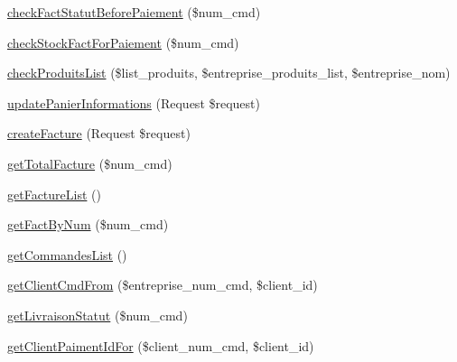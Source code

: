\begin{DoxyCompactItemize}
\item 
\mbox{\hyperlink{class_app_1_1_http_1_1_controllers_1_1_facture_controller_a31a98707fdd24667fdc5f63de65a1b97}{check\+Fact\+Statut\+Before\+Paiement}} (\$num\+\_\+cmd)
\item 
\mbox{\hyperlink{class_app_1_1_http_1_1_controllers_1_1_facture_controller_a9afa0af460ccb1466d9425829c71dd89}{check\+Stock\+Fact\+For\+Paiement}} (\$num\+\_\+cmd)
\item 
\mbox{\hyperlink{class_app_1_1_http_1_1_controllers_1_1_facture_controller_a41644d2baad1924ca3d3ed4b8304b62d}{check\+Produits\+List}} (\$list\+\_\+produits, \$entreprise\+\_\+produits\+\_\+list, \$entreprise\+\_\+nom)
\item 
\mbox{\hyperlink{class_app_1_1_http_1_1_controllers_1_1_facture_controller_ac10d400a1f19f170843319227315573b}{update\+Panier\+Informations}} (Request \$request)
\item 
\mbox{\hyperlink{class_app_1_1_http_1_1_controllers_1_1_facture_controller_abb9c6059d08505a4b6b6dafd694f54c2}{create\+Facture}} (Request \$request)
\item 
\mbox{\hyperlink{class_app_1_1_http_1_1_controllers_1_1_facture_controller_aac960cf269964e84d9d3ad17c3d9e6a6}{get\+Total\+Facture}} (\$num\+\_\+cmd)
\item 
\mbox{\hyperlink{class_app_1_1_http_1_1_controllers_1_1_facture_controller_a52b00a575382920b2b9281a5fb747b63}{get\+Facture\+List}} ()
\item 
\mbox{\hyperlink{class_app_1_1_http_1_1_controllers_1_1_facture_controller_af1922a986f71b25912a31b7a3c11358c}{get\+Fact\+By\+Num}} (\$num\+\_\+cmd)
\item 
\mbox{\hyperlink{class_app_1_1_http_1_1_controllers_1_1_facture_controller_aca6d720230d120442f11c9cd42e17311}{get\+Commandes\+List}} ()
\item 
\mbox{\hyperlink{class_app_1_1_http_1_1_controllers_1_1_facture_controller_ae6979999e885b63b02b23578179afc10}{get\+Client\+Cmd\+From}} (\$entreprise\+\_\+num\+\_\+cmd, \$client\+\_\+id)
\item 
\mbox{\hyperlink{class_app_1_1_http_1_1_controllers_1_1_facture_controller_a58e6eaaddb8358bf39097dc9ad5436b1}{get\+Livraison\+Statut}} (\$num\+\_\+cmd)
\item 
\mbox{\hyperlink{class_app_1_1_http_1_1_controllers_1_1_facture_controller_a85fc4c264062ef7cd58941a186e9ce1b}{get\+Client\+Paiment\+Id\+For}} (\$client\+\_\+num\+\_\+cmd, \$client\+\_\+id)
\item 

\end{DoxyCompactItemize}
